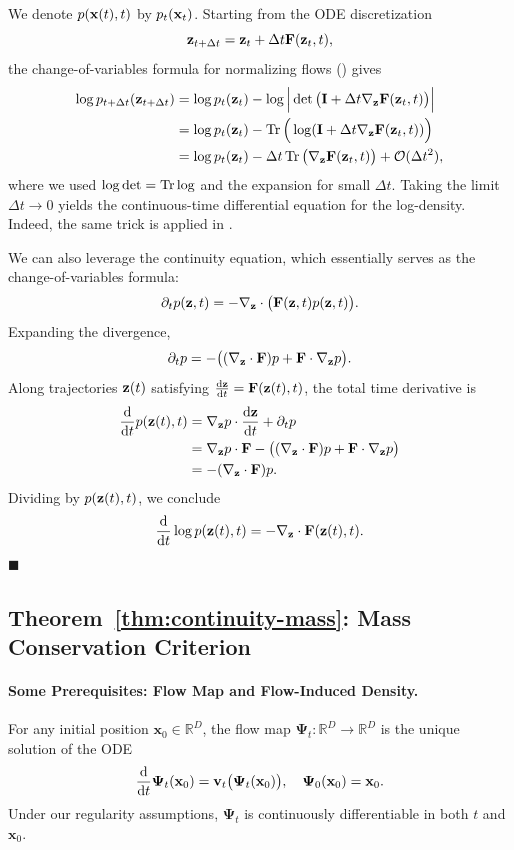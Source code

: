  We denote $p({\mathbf{x}}(t), t)$ by $p_t({\mathbf{x}}_t)$. Starting from the ODE discretization
\[
{\mathbf{z}}_{t+\Delta t} = {\mathbf{z}}_t + \Delta t  {\mathbf{F}}({\mathbf{z}}_t, t),
\]
the change-of-variables formula for normalizing flows () gives
\begin{align*}
    \log p_{t+\Delta t}({\mathbf{z}}_{t+\Delta t}) 
    &= \log p_t({\mathbf{z}}_t) - \log \Big| \det\big({\mathbf{I}} + \Delta t \nabla_{{\mathbf{z}}} {\mathbf{F}}({\mathbf{z}}_t, t)\big) \Big| \\
    &= \log p_t({\mathbf{z}}_t) - \operatorname{Tr}\Big(\log({\mathbf{I}} + \Delta t \nabla_{{\mathbf{z}}} {\mathbf{F}}({\mathbf{z}}_t, t)) \Big) \\
    &= \log p_t({\mathbf{z}}_t) - \Delta t  \operatorname{Tr}\big(\nabla_{{\mathbf{z}}} {\mathbf{F}}({\mathbf{z}}_t, t)\big) + \mathcal{O}(\Delta t^2),
\end{align*}
where we used $\log \det = \operatorname{Tr} \log$ and the expansion for small $\Delta t$.
Taking the limit $\Delta t \to 0$ yields the continuous-time differential equation for the log-density. Indeed, the same trick is applied in .

\vspace{0.3cm}
 We can also leverage the continuity equation, which essentially serves as the change-of-variables formula:
\[
\partial_t p({\mathbf{z}},t) = - \nabla_{{\mathbf{z}}} \cdot \big({\mathbf{F}}({\mathbf{z}},t) p({\mathbf{z}},t)\big).
\]
Expanding the divergence,
\[
\partial_t p = - \big( (\nabla_{{\mathbf{z}}} \cdot {\mathbf{F}}) p + {\mathbf{F}} \cdot \nabla_{{\mathbf{z}}} p \big).
\]
Along trajectories ${\mathbf{z}}(t)$ satisfying $\frac{\mathop{}\!\mathrm{d} {\mathbf{z}}}{\mathop{}\!\mathrm{d} t} = {\mathbf{F}}({\mathbf{z}}(t), t)$, the total time derivative is
\begin{align*}
\frac{\mathop{}\!\mathrm{d}}{\mathop{}\!\mathrm{d} t} p({\mathbf{z}}(t), t) 
&= \nabla_{{\mathbf{z}}} p \cdot \frac{\mathop{}\!\mathrm{d} {\mathbf{z}}}{\mathop{}\!\mathrm{d} t} + \partial_t p \\
&= \nabla_{{\mathbf{z}}} p \cdot {\mathbf{F}} - \big( (\nabla_{{\mathbf{z}}} \cdot {\mathbf{F}}) p + {\mathbf{F}} \cdot \nabla_{{\mathbf{z}}} p \big) \\
&= - (\nabla_{{\mathbf{z}}} \cdot {\mathbf{F}}) p.
\end{align*}
Dividing by $p({\mathbf{z}}(t), t)$, we conclude
\[
\frac{\mathop{}\!\mathrm{d}}{\mathop{}\!\mathrm{d} t} \log p({\mathbf{z}}(t), t) = - \nabla_{{\mathbf{z}}} \cdot {\mathbf{F}}({\mathbf{z}}(t), t).
\]
\hfill$\blacksquare$


\subsection{Theorem~\ref{thm:continuity-mass}: Mass Conservation Criterion}\label{app-sec:mass-conservation}

\paragraph{Some Prerequisites: Flow Map and Flow-Induced Density.} For any initial position $\mathbf{x}_0\in\mathbb{R}^D$, the flow map 
$\bm{\Psi}_t:\mathbb{R}^D\to\mathbb{R}^D$ is the unique solution of the ODE
\[
\frac{\mathop{}\!\mathrm{d}}{\mathop{}\!\mathrm{d} t} \bm{\Psi}_t(\mathbf{x}_0)
= \mathbf{v}_t\bigl(\bm{\Psi}_t(\mathbf{x}_0)\bigr), 
\quad \bm{\Psi}_0(\mathbf{x}_0)=\mathbf{x}_0.
\]
Under our regularity assumptions, $\bm{\Psi}_t$ is continuously differentiable in both $t$ and $\mathbf{x}_0$.

